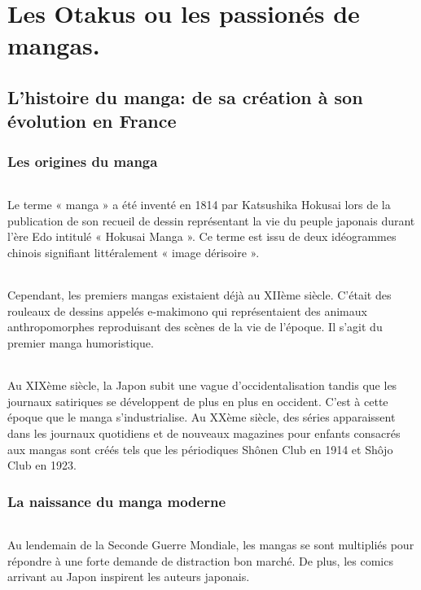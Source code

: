 \part{Les Otakus ou les passionés de mangas.}

\chapter{L'histoire du manga: de sa création à son évolution en France}

\section{Les origines du manga}
\paragraph{}
Le terme « manga » a été inventé en 1814 par Katsushika Hokusai lors de la publication de son recueil de dessin représentant la vie du peuple japonais durant l’ère Edo intitulé « Hokusai Manga ». Ce terme est issu de deux idéogrammes chinois signifiant littéralement « image dérisoire ». 
\paragraph{}
Cependant, les premiers mangas existaient déjà au XIIème  siècle. C’était des rouleaux de dessins appelés e-makimono qui représentaient des animaux anthropomorphes reproduisant des scènes de la vie de l’époque. Il s’agit du premier manga humoristique.
\paragraph{}
Au XIXème siècle, la Japon subit une vague d’occidentalisation tandis que les journaux satiriques se développent de plus en plus en occident. C’est à cette époque que le manga s’industrialise. Au XXème siècle, des séries apparaissent dans les journaux quotidiens et de nouveaux magazines pour enfants consacrés aux mangas sont créés tels que les périodiques Shônen Club en 1914 et Shôjo Club en 1923.

\section{La naissance du manga moderne}
\paragraph{}
Au lendemain de la Seconde Guerre Mondiale, les mangas se sont multipliés pour répondre à une forte demande de distraction bon marché. De plus, les comics arrivant au Japon inspirent les auteurs japonais. 
